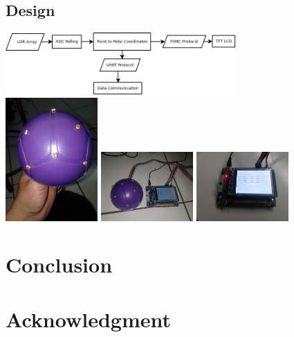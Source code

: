 \documentclass[journal]{IEEEtran}
\begin{document}
\subsection{Design}
\includegraphics[width=250pt]{skema}\\
\includegraphics[width=100pt]{sensorball}
\includegraphics[width=100pt]{wiring}
\includegraphics[width=100pt]{interface}

\section{Conclusion}

\section*{Acknowledgment}

\ifCLASSOPTIONcaptionsoff
  \newpage
\fi
\end{document}
